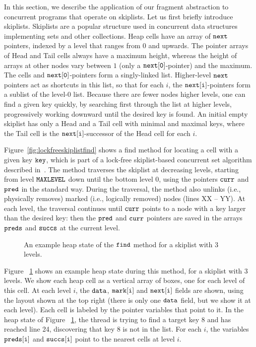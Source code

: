 In this section, we describe the application of our fragment abstraction to concurrent programs that operate on skiplists. Let us first briefly introduce skiplists. Skiplists are a popular structure used in concurrent data structures
implementing sets and other collections.
Heap cells have an array of $\tt next$ pointers, indexed by a level that ranges
from $0$ and upwards. The pointer arrays of Head and Tail cells always have
a maximum height, whereas the height of arrays at other nodes vary between $1$
(only a $\tt next[0]$-pointer) and the maximum. The cells and $\tt next[0]$-pointers form a singly-linked
list. Higher-level $\tt next$ pointers act as shortcuts in this list, so that
for each $i$, the $\tt next[i]$-pointers form a sublist of the level-$0$ list.
Because there are fewer nodes higher levels, one can find a given key quickly,
by searching first through the list at higher levels,
progressively working downward until the desired key is found.
An initial empty skiplist has only a Head and a Tail cell with minimal and
maximal keys, where 
the Tail cell is the $\tt next[i]$-successor of the Head cell for each $i$.

Figure~\ref{fig:lockfreeskiplistfind} shows a find method for locating
a cell with a given key $\tt key$, which is part of a lock-free skiplist-based concurrent set algorithm described in~\cite{ArtOfMpP}.
The method traverses the skiplist at decreasing levels, starting from
level $\tt MAXLEVEL$ down until the bottom level $0$, using the pointers
$\tt curr$ and $\tt pred$ in the standard way.
During the traversal, the method also unlinks (i.e., physically removes)
marked (i.e., logically removed) nodes (lines XX -- YY).
At each level, the traversal continues until $\tt curr$ points to a node
with a key larger than the desired key: then the $\tt pred$ and $\tt curr$ pointers are saved in the arrays $\tt preds$ and $\tt succs$ at the current level.
 \begin{figure}  
   
 \caption{An example heap state of the $\tt find$ method for a skiplist with 3 levels.}
 \label{skiplistshape}
\end{figure}
Figure ~\ref{skiplistshape} shows an example heap state during this method, for
a skiplist with 3 levels. We show each heap cell as a vertical array of
boxes, one for each level of this cell. At each level $i$, the $\tt data$,
$\tt mark[i]$ and $\tt next[i]$ fields are shown, using the layout shown at the top right (there is only one $\tt data$ field, but we show it at each level).
Each cell is labeled by the pointer variables that point to it.
In the heap state of Figure ~\ref{skiplistshape}, the thread is trying to find a target key $8$ and has reached line 24, discovering that key $8$ is not in the list.
For each $i$, the variables $\tt preds[i]$ and $\tt succs[i]$ point to the nearest cells at level $i$.


